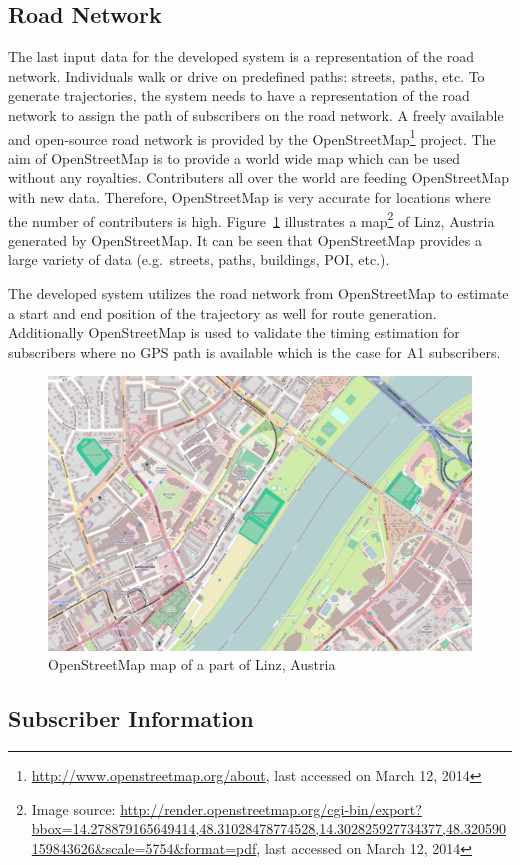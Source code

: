 	\subsection{Road Network}
	The last input data for the developed system is a representation of the road network. Individuals walk or drive on predefined paths: streets, paths, etc. To generate trajectories, the system needs to have a representation of the road network to assign the path of subscribers on the road network. A freely available and open-source road network is provided by the OpenStreetMap\footnote{\url{http://www.openstreetmap.org/about}, last accessed on March 12, 2014} project. The aim of OpenStreetMap is to provide a world wide map which can be used without any royalties. Contributers all over the world are feeding OpenStreetMap with new data. Therefore, OpenStreetMap is very accurate for locations where the number of contributers is high. Figure~\ref{fig:map_linz} illustrates a map\footnote{Image source: \url{http://render.openstreetmap.org/cgi-bin/export?bbox=14.278879165649414,48.31028478774528,14.302825927734377,48.320590159843626&scale=5754&format=pdf}, last accessed on March 12, 2014} of Linz, Austria generated by OpenStreetMap. It can be seen that OpenStreetMap provides a large variety of data (e.g.\ streets, paths, buildings, POI, etc.).
	
	The developed system utilizes the road network from OpenStreetMap to estimate a start and end position of the trajectory as well for route generation. Additionally OpenStreetMap is used to validate the timing estimation for subscribers where no GPS path is available which is the case for A1 subscribers.
	\begin{figure}
		\centering
		\includegraphics[width=0.7\linewidth]{./images/map_linz}
		\caption{OpenStreetMap map of a part of Linz, Austria}
		\label{fig:map_linz}
	\end{figure}
\subsection{Subscriber Information}
